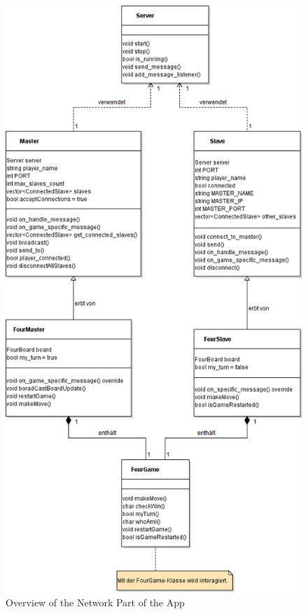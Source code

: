 \begin{figure}
 \includegraphics[height=\textheight]{UML/NetzwerkUML.png}
 \caption{Overview of the Network Part of the App}
\end{figure}
